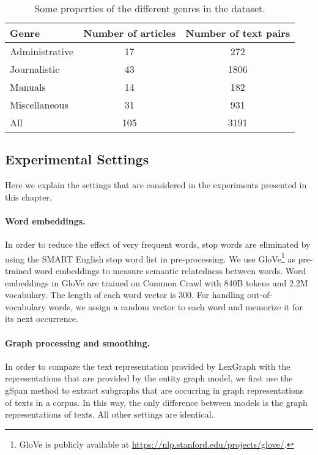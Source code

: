 \begin{table}[!ht]
  \begin{center}
    \begin{tabular}{lcc}
      \toprule
      \textbf{Genre} & \textbf{Number of articles} & \textbf{Number of text pairs} \\
      \midrule
      Administrative  & 17                 & 272                  \\
      Journalistic    & 43                 & 1806                 \\
      Manuals         & 14                 & 182                  \\
      Miscellaneous   & 31                 & 931                  \\
      All             & 105                & 3191                 \\
      \bottomrule
    \end{tabular}
  \end{center}
  \caption{Some properties of the different genres in the \declercqds dataset.}
  \label{tab:genre-prop}
\end{table}

\subsection{Experimental Settings}
Here we explain the settings that are considered in the experiments presented in this chapter. 

\paragraph{Word embeddings.}
In order to reduce the effect of very frequent words, stop words are eliminated by using the SMART English stop word list \cite{salton71} in pre-processing.  
We use GloVe\footnote{GloVe is publicly available at \url{https://nlp.stanford.edu/projects/glove/}.} \cite{pennington14} as \mbox{pre-trained} word embeddings to measure semantic relatedness between words. 
Word embeddings in GloVe are trained on Common Crawl with 840B tokens and 2.2M vocabulary. 
The length of each word vector is 300. 
For handling \mbox{out-of-vocabulary} words, we assign a random vector to each word and memorize it for its next occurrence.  

\paragraph{Graph processing and smoothing.} 
In order to compare the text representation provided by LexGraph with the representations that are provided by the entity graph model, we first use the gSpan method \cite{yanxifeng02} to extract subgraphs that are occurring in graph representations of texts in a corpus. 
In this way, the only difference between models is the graph representations of texts. 
All other settings are identical. 

